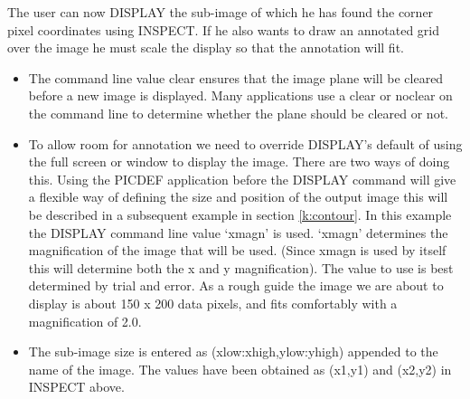 \documentclass[twoside,11pt]{starlink}
\begin{document}
The user can now DISPLAY the sub-image of which he has found the corner pixel
coordinates using INSPECT. If he also wants to draw an annotated grid over
the image he must scale the display so that the annotation will fit.
\begin{small}
\end{small}

\begin{itemize}
\item The command line value clear ensures that the image plane will be
cleared before a new image is displayed. Many applications use a clear or
noclear on the command line to determine whether the plane should be
cleared or not.
\item To allow room for annotation we need to override DISPLAY's default of
using the full screen or window to display the image. There are two ways of
doing this. Using the PICDEF application before the DISPLAY command will give a
flexible way of defining the size and position of the output image this will be
described in a subsequent example in section \ref{k:contour}. In this example
the DISPLAY command line value `xmagn' is used.  `xmagn' determines the
magnification of the image that will be used. (Since xmagn is used by itself
this will determine both the x and y magnification). The value to use is best
determined by trial and error. As a rough guide the image we are about to
display is about 150 x 200 data pixels, and fits comfortably with a
magnification of 2.0.
\item The sub-image size is entered as (xlow:xhigh,ylow:yhigh) appended to
the name of the image. The values have been obtained as (x1,y1) and (x2,y2) in
INSPECT above.
\end{itemize}
\end{document}
